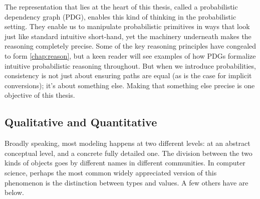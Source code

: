     

The representation that lies at the heart of this thesis, called a probabilistic dependency graph (PDG), enables this kind of thinking in the probabilistic setting.
They enable us to manipulate probabilistic primitives in ways that look just like standard intuitive short-hand, yet the machinery underneath makes the reasoning completely precise.
Some of the key reasoning principles have congealed to form \cref{chap:reason},
but a keen reader will see examples of how PDGs formalize intuitive probabilistic reasoning throughout. 
But when we introduce probabilities, consistency is not just about ensuring paths are equal 
    (as is the case for implicit conversions); it's about something else. 
Making that something else precise is one objective of this thesis. 
%


\subsection{Qualitative and Quantitative}

Broadly speaking, most modeling happens at two different levels: 
    at an abstract conceptual level, and a concrete fully detailed one.
The division between the two kinds of objects
    goes by different names in different communities. 
In computer science, perhaps the most common
    widely appreciated version of this phenomenon is 
    the distinction between types and values.
A few others have are below.

